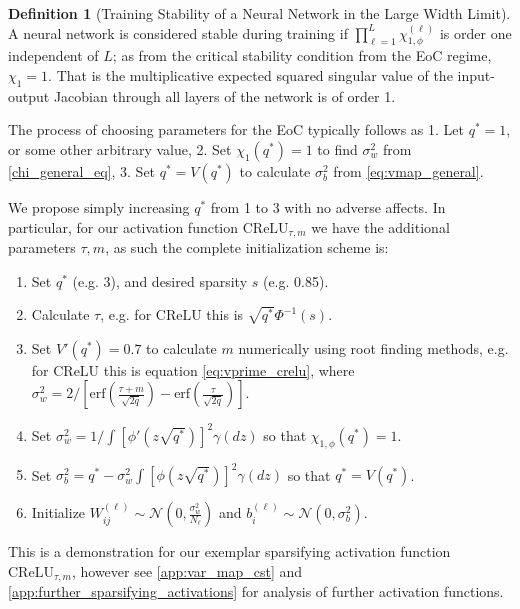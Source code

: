 \documentclass{article}
\theoremstyle{plain}
\theoremstyle{definition}
\newtheorem{definition}[theorem]{Definition}
\theoremstyle{remark}
\begin{document}
\begin{definition}[Training Stability of a Neural Network in the Large Width Limit]{\label{def:training_stability}}
    A neural network is considered stable during training if $\prod_{\ell=1}^L\chi_{1, \phi}^{(\ell)}$ is order one independent of $L$; as from the critical stability condition from the EoC regime, $\chi_1=1$. That is the multiplicative expected squared singular value of the input-output Jacobian through all layers of the network is of order 1.
\end{definition}

The process of choosing parameters for the EoC typically follows as 1. Let $q^*=1$, or some other arbitrary value, 2. Set $\chi_1(q^*) = 1$ to find $\sigma_w^2$ from \eqref{chi_general_eq}, 3. Set $q^* = V(q^*)$ to calculate $\sigma_b^2$ from \eqref{eq:vmap_general}. 

We propose simply increasing $q^*$ from 1 to 3 with no adverse affects. In particular, for our activation function $\text{CReLU}_{\tau, m}$ we have the additional parameters $\tau, m$, as such the complete initialization scheme is:
\begin{enumerate}
    \item Set $q^*$ (e.g. 3), and desired sparsity $s$ (e.g. 0.85).
    \item Calculate $\tau$, e.g. for $\text{CReLU}$ this is $\sqrt{q^*}\Phi^{-1}(s)$.
    \item Set $V'(q^*) = 0.7$ to calculate $m$ numerically using root finding methods, e.g. for $\text{CReLU}$ this is equation \eqref{eq:vprime_crelu}, where $\sigma_w^2 =  2/\left[\text{erf}\left(\frac{\tau+m}{\sqrt{2q}}\right)- \text{erf}\left(\frac{\tau}{\sqrt{2q}}\right)\right]$.
    \item Set $\sigma_w^2=1/\int [\phi'(z\sqrt{q^*})]^2 \gamma(dz)$ so that $\chi_{1, \phi}(q^*) = 1$.
    \item Set $\sigma_b^2=q^*-\sigma_w^2 \int [\phi(z\sqrt{q^*})]^2 \gamma(dz)$ so that $q^* = V(q^*)$.
    \item Initialize $W^{(\ell)}_{ij}\sim\mathcal{N}\left(0,\frac{\sigma_w^2}{N_\ell}\right)$ and $b_i^{(\ell)}\sim \mathcal{N}(0,\sigma_b^2)$.
\end{enumerate}

This is a demonstration for our exemplar sparsifying activation function $\text{CReLU}_{\tau, m}$, however see \cref{app:var_map_cst} and \cref{app:further_sparsifying_activations} for analysis of further activation functions.
\end{document}
